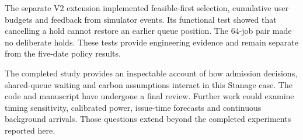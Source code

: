 The separate V2 extension implemented feasible-first selection, cumulative user budgets and feedback from simulator events. Its functional test showed that cancelling a hold cannot restore an earlier queue position. The 64-job pair made no deliberate holds. These tests provide engineering evidence and remain separate from the five-date policy results.

The completed study provides an inspectable account of how admission decisions, shared-queue waiting and carbon assumptions interact in this Stanage case. The code and manuscript have undergone a final review. Further work could examine timing sensitivity, calibrated power, issue-time forecasts and continuous background arrivals. Those questions extend beyond the completed experiments reported here.
